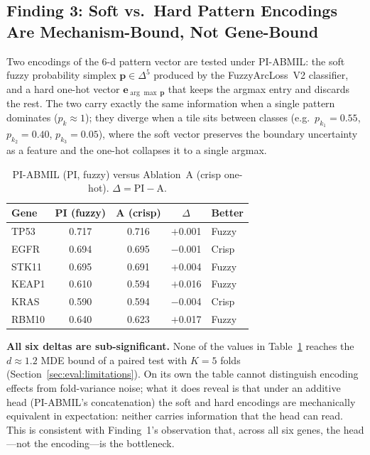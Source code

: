 \subsection{Finding 3: Soft vs.\ Hard Pattern Encodings Are
Mechanism-Bound, Not Gene-Bound}
\label{sec:eval:mutation:finding3}

Two encodings of the 6-d pattern vector are tested under PI-ABMIL:
the soft fuzzy probability simplex
$\mathbf{p} \in \Delta^5$ produced by the FuzzyArcLoss~V2 classifier,
and a hard one-hot vector $\mathbf{e}_{\arg\max\,\mathbf{p}}$ that
keeps the argmax entry and discards the rest.
The two carry exactly the same information when a single pattern
dominates ($p_k \approx 1$); they diverge when a tile sits between
classes (e.g.\ $p_{k_1} = 0.55$, $p_{k_2} = 0.40$, $p_{k_3} = 0.05$),
where the soft vector preserves the boundary uncertainty as a
feature and the one-hot collapses it to a single argmax.

\begin{table}[ht!]
\centering
\caption{PI-ABMIL (PI, fuzzy) versus Ablation~A (crisp one-hot).
$\Delta = \text{PI} - \text{A}$.}
\label{tab:fuzzy_vs_crisp}
\begin{tabular}{l c c c l}
\hline
\textbf{Gene} & \textbf{PI (fuzzy)} & \textbf{A (crisp)} &
\textbf{$\Delta$} & \textbf{Better} \\
\hline
TP53  & 0.717 & 0.716 & $+$0.001 & Fuzzy \\
EGFR  & 0.694 & 0.695 & $-$0.001 & Crisp \\
STK11 & 0.695 & 0.691 & $+$0.004 & Fuzzy \\
KEAP1 & 0.610 & 0.594 & $+$0.016 & Fuzzy \\
KRAS  & 0.590 & 0.594 & $-$0.004 & Crisp \\
RBM10 & 0.640 & 0.623 & $+$0.017 & Fuzzy \\
\hline
\end{tabular}
\end{table}

\textbf{All six deltas are sub-significant.}
None of the values in Table~\ref{tab:fuzzy_vs_crisp} reaches the
$d \approx 1.2$ MDE bound of a paired test with $K = 5$ folds
(Section~\ref{sec:eval:limitations}).
On its own the table cannot distinguish encoding effects from
fold-variance noise; what it does reveal is that under an additive
head (PI-ABMIL's concatenation) the soft and hard encodings are
mechanically equivalent in expectation: neither carries
information that the head can read.
This is consistent with Finding~1's observation that, across all
six genes, the head---not the encoding---is the bottleneck.

